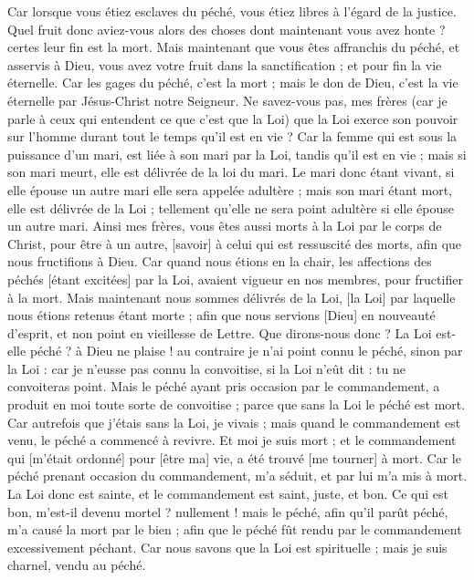 \begin{multicols}{2}
Car lorsque vous étiez esclaves du péché, vous étiez libres à l'égard de la justice.
Quel fruit donc aviez-vous alors des choses dont maintenant vous avez honte ? certes leur fin est la mort.
Mais maintenant que vous êtes affranchis du péché, et asservis à Dieu, vous avez votre fruit dans la sanctification ; et pour fin la vie éternelle.
Car les gages du péché, c'est la mort ; mais le don de Dieu, c'est la vie éternelle par Jésus-Christ notre Seigneur.
\VerseOne{}Ne savez-vous pas, mes frères (car je parle à ceux qui entendent ce que c'est que la Loi) que la Loi exerce son pouvoir sur l'homme durant tout le temps qu'il est en vie ?
Car la femme qui est sous la puissance d'un mari, est liée à son mari par la Loi, tandis qu'il est en vie ; mais si son mari meurt, elle est délivrée de la loi du mari.
Le mari donc étant vivant, si elle épouse un autre mari elle sera appelée adultère ; mais son mari étant mort, elle est délivrée de la Loi ; tellement qu'elle ne sera point adultère si elle épouse un autre mari.
Ainsi mes frères, vous êtes aussi morts à la Loi par le corps de Christ, pour être à un autre, [savoir] à celui qui est ressuscité des morts, afin que nous fructifions à Dieu.
Car quand nous étions en la chair, les affections des péchés [étant excitées] par la Loi, avaient vigueur en nos membres, pour fructifier à la mort.
Mais maintenant nous sommes délivrés de la Loi, [la Loi] par laquelle nous étions retenus étant morte ; afin que nous servions [Dieu] en nouveauté d'esprit, et non point en vieillesse de Lettre.
Que dirons-nous donc ? La Loi est-elle péché ? à Dieu ne plaise ! au contraire je n'ai point connu le péché, sinon par la Loi : car je n'eusse pas connu la convoitise, si la Loi n'eût dit : tu ne convoiteras point.
Mais le péché ayant pris occasion par le commandement, a produit en moi toute sorte de convoitise ; parce que sans la Loi le péché est mort.
Car autrefois que j'étais sans la Loi, je vivais ; mais quand le commandement est venu, le péché a commencé à revivre.
Et moi je suis mort ; et le commandement qui [m'était ordonné] pour [être ma] vie, a été trouvé [me tourner] à mort.
Car le péché prenant occasion du commandement, m'a séduit, et par lui m'a mis à mort.
La Loi donc est sainte, et le commandement est saint, juste, et bon.
Ce qui est bon, m'est-il devenu mortel ? nullement ! mais le péché, afin qu'il parût péché, m'a causé la mort par le bien ; afin que le péché fût rendu par le commandement excessivement péchant.
Car nous savons que la Loi est spirituelle ; mais je suis charnel, vendu au péché.

\end{multicols}
